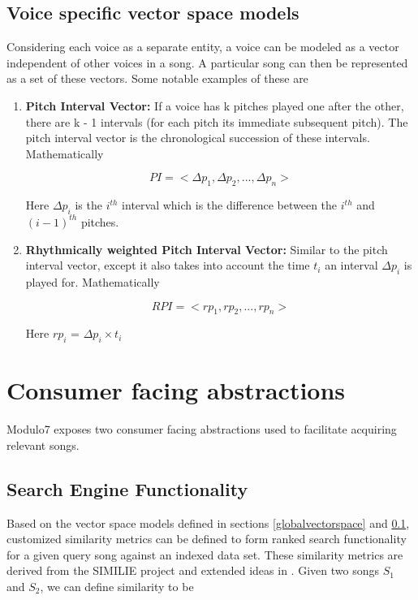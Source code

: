 \documentclass{article}
\begin{document}
\subsection{Voice specific vector space models} \label{voicespecificvectorspace}
 
Considering each voice as a separate entity, a voice can be modeled as a vector independent of other voices in a song. A particular song can then be represented as a set of these vectors. Some notable examples of these are 

\begin{enumerate}
\item \textbf{Pitch Interval Vector:} If a voice has k pitches played one after the other, there are  k - 1 intervals (for each pitch its immediate subsequent pitch). The pitch interval vector is the chronological succession of these intervals. Mathematically 

\begin{equation}
PI = <\Delta p_1, \Delta p_2, ... , \Delta p_n>
\end{equation}

Here $\Delta p_i$ is the $i^{th}$ interval which is the difference between the $i^{th}$ and $(i - 1)^{th}$ pitches. 

\item \textbf{Rhythmically weighted Pitch Interval Vector:} Similar to the pitch interval vector, except it also takes into account the time $t_i$ an interval $\Delta p_i$ is played for. Mathematically

\begin{equation}
RPI = <rp_1, rp_2, ... , rp_n>
\end{equation}

Here $rp_i$ = $\Delta p_i \times t_i$

\end{enumerate}
 
\section{Consumer facing abstractions} 

Modulo7 exposes two consumer facing abstractions used to facilitate acquiring relevant songs. 

\subsection{Search Engine Functionality} \label{searchengine}

Based on the vector space models defined in sections \ref{globalvectorspace} and
\ref{voicespecificvectorspace}, customized similarity metrics can be defined to form ranked search functionality for a given query song against an indexed data set. These similarity metrics are derived from the SIMILIE project \cite{similie} and extended ideas in \cite{smithwatermanmusic}. Given two songs $S_1$ and $S_2$, we can define similarity to be 
\end{document}
